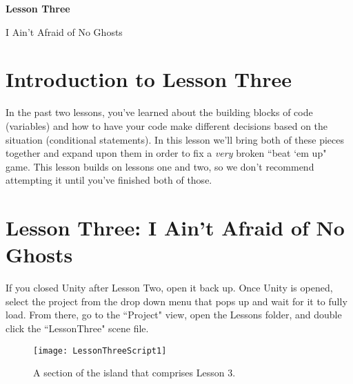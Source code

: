 \documentclass{article}
\begin{document}
\vspace*{\fill}
\begin{center}
{\Huge\bf Lesson Three}

\vspace{2\baselineskip}

{\huge I Ain't Afraid of No Ghosts}
\end{center}
\vspace*{\fill}
\newpage



\section{Introduction to Lesson Three}

In the past two lessons, you've learned about the building blocks of code (variables) and how to have your code make different decisions based on the situation (conditional statements). In this lesson we'll bring both of these pieces together and expand upon them in order to fix a \textit{very} broken ``beat `em up" game. This lesson builds on lessons one and two, so we don't recommend attempting it until you've finished both of those. 

\section{Lesson Three: I Ain't Afraid of No Ghosts}

If you closed Unity after Lesson Two, open it back up. Once Unity is opened, select the project from the drop down menu that pops up and wait for it to fully load. From there, go to the ``Project" view, open the Lessons folder, and double click the ``LessonThree" scene file. 

\noindent{}

\begin{figure}
  \texttt{[image: LessonThreeScript1]}
  \caption{A section of the island that comprises Lesson 3.}
  \label{fig:LessonThreeScript1}
\end{figure}
\end{document}
